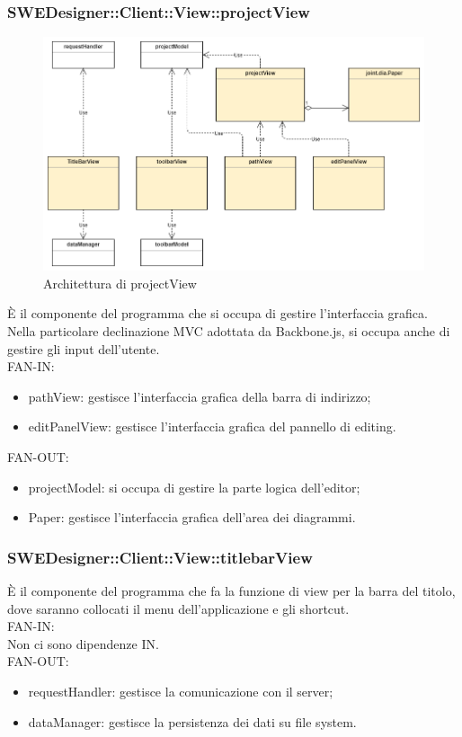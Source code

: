 \documentclass[../DefinizioneDiProdotto.tex]{subfiles}
\begin{document}
				\subsubsection{SWEDesigner::Client::View::projectView}
					\begin{figure}[H]\label{fig:MainModel}
						\centering
						\includegraphics[scale=0.44]{Immagini/DiagrammaArchitettura/MainView.png}
						\caption{Architettura di projectView}
					\end{figure}

				È il componente del programma che si occupa di gestire l'interfaccia grafica. Nella particolare declinazione MVC adottata da Backbone.js, si occupa anche di gestire gli input dell'utente.\\
					FAN-IN:
					\begin{itemize}
						\item pathView: gestisce l'interfaccia grafica della barra di indirizzo;
						\item editPanelView: gestisce l'interfaccia grafica del pannello di editing.
					\end{itemize}
					FAN-OUT:
					\begin{itemize}
						\item projectModel: si occupa di gestire la parte logica dell'editor;
						\item Paper: gestisce l'interfaccia grafica dell'area dei diagrammi.
					\end{itemize}

				\subsubsection{SWEDesigner::Client::View::titlebarView}
				È il componente del programma che fa la funzione di view per la barra del titolo, dove saranno collocati il menu dell’applicazione e gli shortcut.\\
					FAN-IN:\\
					Non ci sono dipendenze IN.\\
					FAN-OUT:
					\begin{itemize}
						\item requestHandler: gestisce la comunicazione con il server;
						\item dataManager: gestisce la persistenza dei dati su file system.
					\end{itemize}
\end{document}

